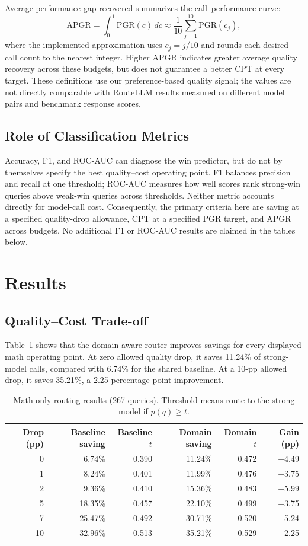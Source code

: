 \documentclass[conference]{IEEEtran}
\begin{document}
Average performance gap recovered summarizes the call--performance curve:
\begin{equation}
\mathrm{APGR}=\int_0^1\mathrm{PGR}(c)\,dc
\approx\frac{1}{10}\sum_{j=1}^{10}\mathrm{PGR}(c_j),
\end{equation}
where the implemented approximation uses $c_j=j/10$ and rounds each desired call count to the nearest integer. Higher APGR indicates greater average quality recovery across these budgets, but does not guarantee a better CPT at every target. These definitions use our preference-based quality signal; the values are not directly comparable with RouteLLM results measured on different model pairs and benchmark response scores.

\subsection{Role of Classification Metrics}
Accuracy, F1, and ROC-AUC can diagnose the win predictor, but do not by themselves specify the best quality--cost operating point. F1 balances precision and recall at one threshold; ROC-AUC measures how well scores rank strong-win queries above weak-win queries across thresholds. Neither metric accounts directly for model-call cost. Consequently, the primary criteria here are saving at a specified quality-drop allowance, CPT at a specified PGR target, and APGR across budgets. No additional F1 or ROC-AUC results are claimed in the tables below.

\section{Results}
\subsection{Quality--Cost Trade-off}
Table~\ref{tab:math} shows that the domain-aware router improves savings for every displayed math operating point. At zero allowed quality drop, it saves 11.24\% of strong-model calls, compared with 6.74\% for the shared baseline. At a 10-pp allowed drop, it saves 35.21\%, a 2.25 percentage-point improvement.

\begin{table}[t]
\caption{Math-only routing results (267 queries). Threshold means route to the strong model if $p(q)\geq t$.}
\label{tab:math}
\centering
\begin{tabular}{rrrrrr}
\toprule
Drop (pp) & Baseline saving & Baseline $t$ & Domain saving & Domain $t$ & Gain (pp) \\
\midrule
0  & 6.74\%  & 0.390 & 11.24\% & 0.472 & +4.49 \\
1  & 8.24\%  & 0.401 & 11.99\% & 0.476 & +3.75 \\
2  & 9.36\%  & 0.410 & 15.36\% & 0.483 & +5.99 \\
5  & 18.35\% & 0.457 & 22.10\% & 0.499 & +3.75 \\
7  & 25.47\% & 0.492 & 30.71\% & 0.520 & +5.24 \\
10 & 32.96\% & 0.513 & 35.21\% & 0.529 & +2.25 \\
\bottomrule
\end{tabular}
\end{table}
\end{document}
